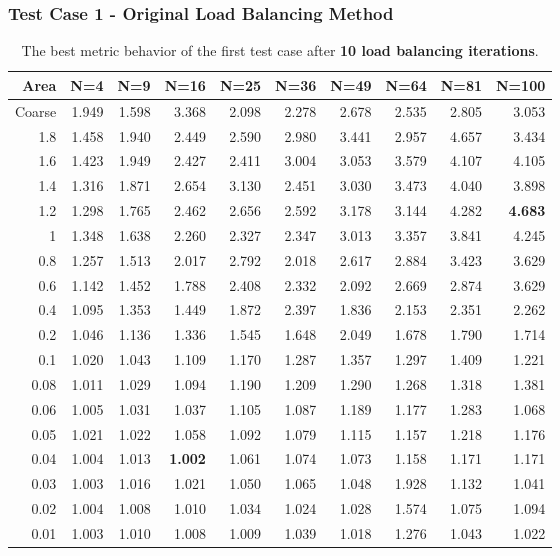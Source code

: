 \documentclass[compress]{beamer}
\begin{document}
\begin{frame}[t]\frametitle{Test Case 1 - Original Load Balancing Method}
\begin{table}[H]
\tiny
\centering
\caption{The best metric behavior of the first test case after \textbf{10 load balancing iterations}.} 
\begin{tabular}{rrrrrrrrrr}
\hline
 Area & N=4 & N=9 & N=16 & N=25 & N=36 & N=49 & N=64 & N=81 & N=100 \\ 
\hline
 Coarse& 1.949 & 1.598 & 3.368 & 2.098 & 2.278 & 2.678 & 2.535 & 2.805 & 3.053 \\
 1.8 &1.458 & 1.940 & 2.449 & 2.590 & 2.980 & 3.441 & 2.957 & 4.657 & 3.434 \\
 1.6 & 1.423 & 1.949 & 2.427 & 2.411 & 3.004 & 3.053 & 3.579 & 4.107 & 4.105 \\
 1.4 & 1.316 & 1.871 & 2.654 & 3.130 & 2.451 & 3.030 & 3.473 & 4.040 & 3.898 \\
 1.2 & 1.298 & 1.765 & 2.462 & 2.656 & 2.592 & 3.178 & 3.144 & 4.282 & \textbf{\cellcolor{blue!25}4.683} \\
 1 & 1.348 & 1.638 & 2.260 & 2.327 & 2.347 & 3.013 & 3.357 & 3.841 & 4.245 \\
 0.8 & 1.257 & 1.513 & 2.017 & 2.792 & 2.018 & 2.617 & 2.884 & 3.423 & 3.629 \\
 0.6 & 1.142 & 1.452 & 1.788 & 2.408 & 2.332 & 2.092 & 2.669 & 2.874 & 3.629 \\
 0.4 & 1.095 & 1.353 & 1.449 & 1.872 & 2.397 & 1.836 & 2.153 & 2.351 & 2.262 \\
 0.2 & 1.046 & 1.136 & 1.336 & 1.545 & 1.648 & 2.049 & 1.678 & 1.790 & 1.714 \\
 0.1 & 1.020 & 1.043 & 1.109 & 1.170 & 1.287 & 1.357 & 1.297 & 1.409 & 1.221 \\
 0.08 & 1.011 & 1.029 & 1.094 & 1.190 & 1.209 & 1.290 & 1.268 & 1.318 & 1.381 \\
 0.06 & 1.005 & 1.031 & 1.037 & 1.105 & 1.087 & 1.189 & 1.177 & 1.283 & 1.068 \\
 0.05 & 1.021 & 1.022 & 1.058 & 1.092 & 1.079 & 1.115 & 1.157 & 1.218 & 1.176 \\
 0.04 & 1.004 & 1.013 & \textbf{\cellcolor{blue!25}1.002} & 1.061 & 1.074 & 1.073 & 1.158 & 1.171 & 1.171 \\
 0.03 & 1.003 & 1.016 & 1.021 & 1.050 & 1.065 & 1.048 & 1.928 & 1.132 & 1.041 \\
 0.02 & 1.004 & 1.008 & 1.010 & 1.034 & 1.024 & 1.028 & 1.574 & 1.075 & 1.094 \\
 0.01& 1.003 & 1.010 & 1.008 & 1.009 & 1.039 & 1.018 & 1.276 & 1.043 & 1.022 \\
\hline
\end{tabular}
\end{table}
\end{frame}
\end{document}
